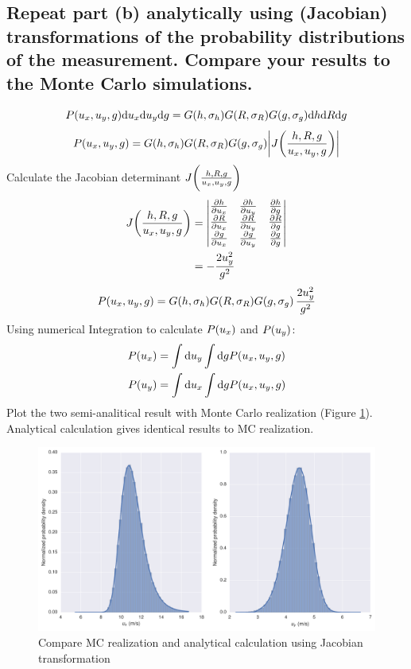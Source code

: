 \documentclass[paper=letter, fontsize=11pt]{scrartcl} %
\begin{document}
\subsection{ Repeat part (b) analytically using (Jacobian)
  transformations of the probability distributions of the
  measurement. Compare your results to the Monte Carlo simulations.}
\newcommand{\gaussian}[1]{\ensuremath{G(#1, \sigma_{#1})}}
\begin{equation}
  P(\ux, \uy, g) \dd\ux \dd\uy \dd g =
  \gaussian{h}\gaussian{R}\gaussian{g} \dd h \dd R \dd g
\end{equation}
\begin{equation}
  P(\ux, \uy, g) = \gaussian{h}\gaussian{R}\gaussian{g}
  \biggl|J\biggl(\frac{h, R, g}{\ux, \uy, g}\biggr)\biggr|
\end{equation}
Calculate the Jacobian determinant $J\biggl(\frac{h, R, g}{u_x, u_y,
  g}\biggr)$
\newcommand{\pfrac}[2]{\ensuremath{\frac{\partial #1}{\partial #2}}}
\begin{equation}
  \begin{split}
    J\biggl(\frac{h, R, g}{\ux, \uy,g}\biggr) &=
    \begin{vmatrix}
      \pfrac{h}{\ux}& \pfrac{h}{\uy} &\pfrac{h}{g}\\
      \pfrac{R}{\ux}& \pfrac{R}{\uy} &\pfrac{R}{g}\\
      \pfrac{g}{\ux}& \pfrac{g}{\uy} &\pfrac{g}{g}\\
    \end{vmatrix}\\
    & = -\frac{2\uy^{2}}{g^{2}}
  \end{split}
\end{equation}
\begin{equation}
  P(\ux, \uy, g) = \gaussian{h}\gaussian{R}\gaussian{g} \,\frac{2\uy^{2}}{g^{2}}
\end{equation}
Using numerical Integration to calculate $P(u_x)$ and $P(u_y)$:
\begin{align}
  P(u_x) &= \int \mathrm{d}u_y \int\mathrm{d} g P(u_x, u_y, g)\\
   P(u_y) &= \int \mathrm{d}u_x \int\mathrm{d} g P(u_x, u_y, g)
\end{align}
Plot the two semi-analitical result with Monte Carlo realization
(Figure \ref{fig:Jacobian}). Analytical calculation gives identical
results to MC realization.
\begin{figure}[!ht]
  \centering
  \includegraphics[width=\textwidth]{MC_Jacobian}
  \caption{Compare MC realization and analytical calculation using
    Jacobian transformation}
  \label{fig:Jacobian}
\end{figure}
\end{document}

